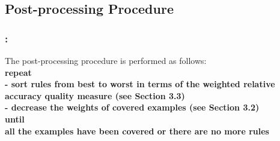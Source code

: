 \documentclass{beamer}
\begin{document}
\begin{CJK*}{UTF8}{bsmi}
\subsection{Post-processing Procedure}
\begin{frame}
	\frametitle{\insertsection : \insertsubsection}
	\begin{block}{The post-processing procedure is performed as follows:}
		~\\
		\textbf{repeat}\\
	\textbf{	- sort rules from best to worst in terms of the weighted relative accuracy quality measure (see Section 3.3)}\\
		\textbf{- decrease the weights of covered examples (see Section 3.2)}\\
		\textbf{until}\\
		 \textbf{ all the examples have been covered or there are no more rules}
		 \\
		 ~\\
	\end{block}
\end{frame}

\end{CJK*}
\end{document}
